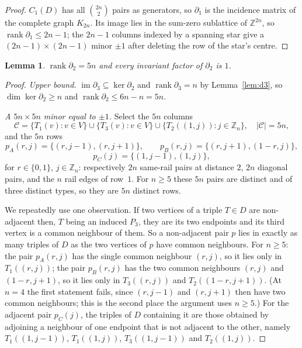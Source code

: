 \documentclass[11pt]{amsart}
\newtheorem{lemma}[theorem]{Lemma}
\theoremstyle{definition}
\DeclareMathOperator{\rank}{rank}
\newcommand{\Zm}{\mathbb{Z}}
\begin{document}
\begin{proof}
$C_1(D)$ has all $\binom{2n}{2}$ pairs as generators, so $\partial_1$ is the incidence matrix of the
complete graph $K_{2n}$. Its image lies in the sum-zero sublattice of $\Zm^{2n}$, so
$\rank\partial_1\le 2n-1$; the $2n-1$ columns indexed by a spanning star give a $(2n-1)\times(2n-1)$
minor $\pm1$ after deleting the row of the star's centre.
\end{proof}

\begin{lemma}\label{lem:d2}
$\rank\partial_2=5n$ and every invariant factor of $\partial_2$ is $1$.
\end{lemma}

\begin{proof}
\emph{Upper bound.} $\operatorname{im}\partial_3\subseteq\ker\partial_2$ and
$\rank\partial_3=n$ by Lemma~\ref{lem:d3}, so $\dim\ker\partial_2\ge n$ and
$\rank\partial_2\le 6n-n=5n$.

\emph{A $5n\times5n$ minor equal to $\pm1$.} Select the $5n$ columns
\[
 \mathcal C=\{T_1(v):v\in V\}\cup\{T_3(v):v\in V\}\cup\{T_2((1,j)):j\in\Zm_n\},
 \quad |\mathcal C|=5n,
\]
and the $5n$ rows
\[
 p_A(r,j)=\{(r,j{-}1),(r,j{+}1)\},\qquad
 p_B(r,j)=\{(r,j{+}1),(1{-}r,j)\},
\]
\[
 p_C(j)=\{(1,j{-}1),(1,j)\},
\]
for $r\in\{0,1\}$, $j\in\Zm_n$: respectively $2n$ same-rail pairs at distance $2$, $2n$ diagonal
pairs, and the $n$ rail edges of row~$1$. For $n\ge5$ these $5n$ pairs are distinct and of three
distinct types, so they are $5n$ distinct rows.

We repeatedly use one observation. If two vertices of a triple $T\in D$ are non-adjacent then, $T$
being an induced $P_3$, they are its two endpoints and its third vertex is a common neighbour of them.
So a non-adjacent pair $p$ lies in exactly as many triples of $D$ as the two vertices of $p$ have
common neighbours. For $n\ge5$: the pair $p_A(r,j)$ has the single common neighbour $(r,j)$, so it
lies only in $T_1((r,j))$; the pair $p_B(r,j)$ has the two common neighbours $(r,j)$ and $(1-r,j+1)$,
so it lies only in $T_3((r,j))$ and $T_2((1{-}r,j{+}1))$. (At $n=4$ the first statement fails, since
$(r,j-1)$ and $(r,j+1)$ then have two common neighbours; this is the second place the argument uses
$n\ge5$.) For the adjacent pair $p_C(j)$, the triples of $D$ containing it are those obtained by
adjoining a neighbour of one endpoint that is not adjacent to the other, namely
$T_1((1,j{-}1))$, $T_1((1,j))$, $T_3((1,j{-}1))$ and $T_2((1,j))$.


\end{proof}
\end{document}
